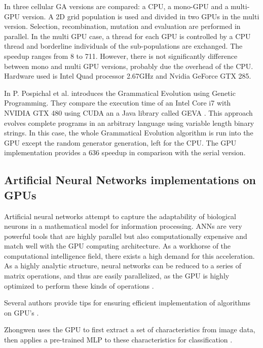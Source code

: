 \documentclass[prodmode,acmtecs]{acmsmall}
\begin{document}
In \cite{5586530} three cellular GA versions are compared: a CPU, a mono-GPU and a multi-GPU version. A 2D grid population is used and divided in two GPUs in the multi version. Selection, recombination, mutation and evaluation are performed in parallel. In the multi GPU case, a thread for each GPU is controlled by a CPU thread and borderline individuals of the sub-populations are exchanged. The
speedup ranges from 8 to 711. However, there is not significantly difference between mono and multi GPU versions, probably due the overhead of the CPU. Hardware used is Intel Quad processor 2.67GHz and Nvidia GeForce GTX 285.

In \cite{DBLP:conf/gecco/PospichalMOSJ11} P. Pospichal et al. introduces the Grammatical Evolution using Genetic Programming. They compare the execution time of an Intel Core i7 with NVIDIA GTX 480 using CUDA an a Java library called GEVA \cite{O'Neill:2008:GGE:1527063.1527066}. This approach evolves complete programs in an arbitrary language using variable length binary strings. In this case, the whole Grammatical Evolution algorithm is run into the GPU except the random generator generation, left for the CPU. The GPU implementation provides a 636 speedup in comparison with the serial version.

\subsection{Artificial Neural Networks implementations on GPUs}

Artificial neural networks attempt to capture the adaptability of biological neurons in a mathematical model for information processing. ANNs are very powerful tools that are highly parallel but also computationally expensive and match well with the GPU computing architecture.  As a workhorse of the computational intelligence field, there exists a high demand for  this acceleration.  As a highly analytic structure, neural networks can be reduced to a series of matrix operations, and thus are easily parallelized, as the GPU is highly optimized to perform these kinds of operations \cite{Meuth2006}.  

Several authors provide tips for ensuring efficient implementation  of algorithms on GPU’s \cite{Oh2004,Luo2005,Martinez2007,Martinez2010}.

Zhongwen uses the GPU to first extract a set of characteristics from image data, then applies a pre-trained MLP to these characteristics for classification \cite{Luo2005}.
\end{document}
